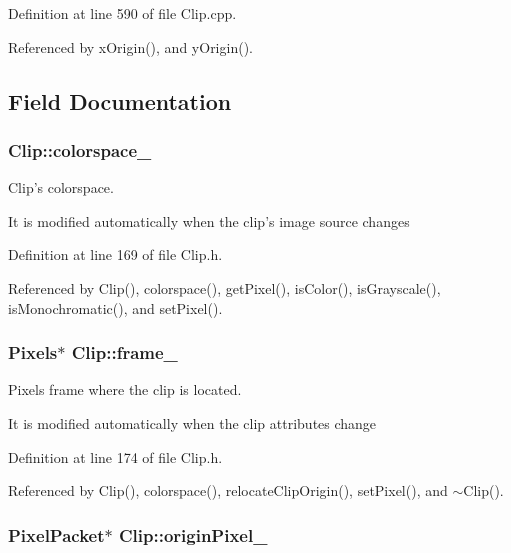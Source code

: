 Definition at line 590 of file Clip.cpp.

Referenced by xOrigin(), and yOrigin().

\subsection{Field Documentation}
\hypertarget{class_clip_51b03c04118374cedeaa0d7a0ba37079}{
\subsubsection[colorspace\_\-]{ {\bf Clip::colorspace\_\-}}}
\label{class_clip_51b03c04118374cedeaa0d7a0ba37079}


Clip's colorspace. 

It is modified automatically when the clip's image source changes 

Definition at line 169 of file Clip.h.

Referenced by Clip(), colorspace(), getPixel(), isColor(), isGrayscale(), isMonochromatic(), and setPixel().\hypertarget{class_clip_2978b7e7061c444375c005ffc3d24416}{
\subsubsection[frame\_\-]{\setlength{\rightskip}{0pt plus 5cm}Pixels$\ast$ {\bf Clip::frame\_\-}}}
\label{class_clip_2978b7e7061c444375c005ffc3d24416}


Pixels frame where the clip is located. 

It is modified automatically when the clip attributes change 

Definition at line 174 of file Clip.h.

Referenced by Clip(), colorspace(), relocateClipOrigin(), setPixel(), and $\sim$Clip().\hypertarget{class_clip_838228267146fd74e2828b7173b61091}{
\subsubsection[originPixel\_\-]{\setlength{\rightskip}{0pt plus 5cm}PixelPacket$\ast$ {\bf Clip::originPixel\_\-}}}
\label{class_clip_838228267146fd74e2828b7173b61091}


